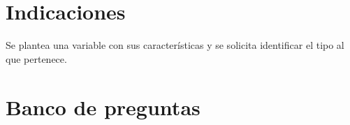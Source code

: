 \documentclass[a4,11pt]{aleph-notas-beta}
\begin{document}
\encabezado

\vspace*{-8mm}
\section{Indicaciones}

Se plantea una variable con sus características y se solicita identificar el tipo al que pertenece.

\section{Banco de preguntas}
\end{document}
